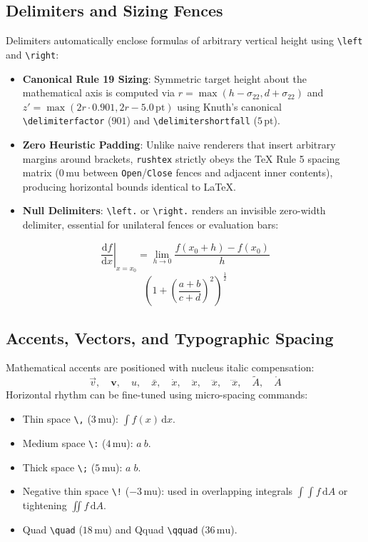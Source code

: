 \documentclass[11pt, a4paper]{article}
\begin{document}
\subsection{Delimiters and Sizing Fences}
Delimiters automatically enclose formulas of arbitrary vertical height using \verb|\left| and \verb|\right|:
\begin{itemize}
\item \textbf{Canonical Rule 19 Sizing}: Symmetric target height about the mathematical axis is computed via $r = \max(h - \sigma_{22}, d + \sigma_{22})$ and $z' = \max(2r \cdot 0.901, 2r - 5.0\,\text{pt})$ using Knuth's canonical \texttt{\textbackslash delimiterfactor} ($901$) and \texttt{\textbackslash delimitershortfall} ($5\,\text{pt}$).
\item \textbf{Zero Heuristic Padding}: Unlike naive renderers that insert arbitrary margins around brackets, \texttt{rushtex} strictly obeys the TeX Rule 5 spacing matrix ($0\,\text{mu}$ between \texttt{Open}/\texttt{Close} fences and adjacent inner contents), producing horizontal bounds identical to LaTeX.
\item \textbf{Null Delimiters}: \verb|\left.| or \verb|\right.| renders an invisible zero-width delimiter, essential for unilateral fences or evaluation bars:
\end{itemize}
\[
\left. \frac{\mathrm{d}f}{\mathrm{d}x} \right|_{x=x_0} = \lim_{h \to 0} \frac{f(x_0 + h) - f(x_0)}{h}
\]
\[
\left( 1 + \left( \frac{a + b}{c + d} \right)^2 \right)^{\frac{1}{2}}
\]

\subsection{Accents, Vectors, and Typographic Spacing}
Mathematical accents are positioned with nucleus italic compensation:
\[
\vec{v}, \quad \mathbf{v}, \quad \hat{u}, \quad \bar{x}, \quad \dot{x}, \quad \ddot{x}, \quad \dddot{x}, \quad \ddddot{x}, \quad \tilde{A}, \quad \mathring{A}
\]
Horizontal rhythm can be fine-tuned using micro-spacing commands:
\begin{itemize}
\item Thin space \verb|\,| ($3\,\text{mu}$): $\int f(x) \, \mathrm{d}x$.
\item Medium space \verb|\:| ($4\,\text{mu}$): $a \: b$.
\item Thick space \verb|\;| ($5\,\text{mu}$): $a \; b$.
\item Negative thin space \verb|\!| ($-3\,\text{mu}$): used in overlapping integrals $\int\!\!\int f \, \mathrm{d}A$ or tightening $\iint\! f \, \mathrm{d}A$.
\item Quad \verb|\quad| ($18\,\text{mu}$) and Qquad \verb|\qquad| ($36\,\text{mu}$).
\end{itemize}
\end{document}
